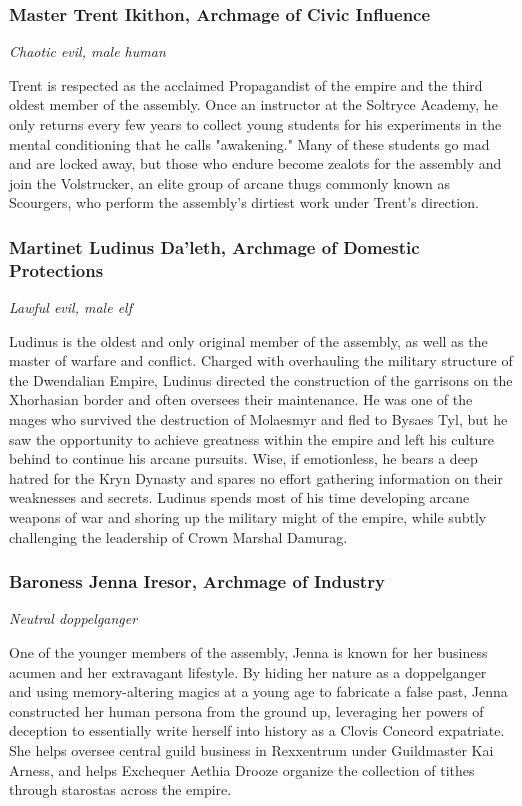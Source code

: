 \documentclass[10pt,a4paper,twoside,bg=print,twocolumn,openany,nodeprecatedcode]{dndbook}
\begin{document}
\subsubsection{Master Trent Ikithon, Archmage of Civic Influence}
\textit{Chaotic evil, male human}

Trent is respected as the acclaimed Propagandist of the empire and the third oldest member of the assembly. Once an instructor at the Soltryce Academy, he only returns every few years to collect young students for his experiments in the mental conditioning that he calls "awakening." Many of these students go mad and are locked away, but those who endure become zealots for the assembly and join the Volstrucker, an elite group of arcane thugs commonly known as Scourgers, who perform the assembly's dirtiest work under Trent's direction.

\subsubsection{Martinet Ludinus Da'leth, Archmage of Domestic Protections}
\textit{Lawful evil, male elf}

Ludinus is the oldest and only original member of the assembly, as well as the master of warfare and conflict. Charged with overhauling the military structure of the Dwendalian Empire, Ludinus directed the construction of the garrisons on the Xhorhasian border and often oversees their maintenance. He was one of the mages who survived the destruction of Molaesmyr and fled to Bysaes Tyl, but he saw the opportunity to achieve greatness within the empire and left his culture behind to continue his arcane pursuits. Wise, if emotionless, he bears a deep hatred for the Kryn Dynasty and spares no effort gathering information on their weaknesses and secrets. Ludinus spends most of his time developing arcane weapons of war and shoring up the military might of the empire, while subtly challenging the leadership of Crown Marshal Damurag.

\subsubsection{Baroness Jenna Iresor, Archmage of Industry}
\textit{Neutral doppelganger}

One of the younger members of the assembly, Jenna is known for her business acumen and her extravagant lifestyle. By hiding her nature as a doppelganger and using memory-altering magics at a young age to fabricate a false past, Jenna constructed her human persona from the ground up, leveraging her powers of deception to essentially write herself into history as a Clovis Concord expatriate. She helps oversee central guild business in Rexxentrum under Guildmaster Kai Arness, and helps Exchequer Aethia Drooze organize the collection of tithes through starostas across the empire.
\end{document}
